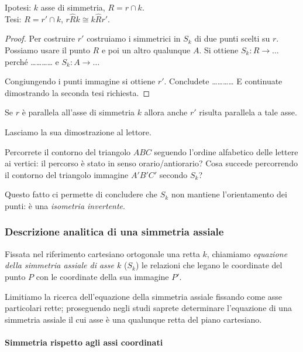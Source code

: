 \noindent Ipotesi: $k$ asse di simmetria, $R=r\cap k$.\\
Tesi: $R=r'\cap k$, $r\widehat{R}k\cong k\widehat{R}r'$.

\begin{proof}
Per costruire $r'$ costruiamo i simmetrici in $S_k$ di due punti scelti su $r$. Possiamo usare il punto $R$ e poi un altro qualunque $A$. Si ottiene $S_k: R \rightarrow \ldots{}$ perché \ldots\ldots\ldots\ldots{} e $S_k: A \rightarrow \ldots{}$

Congiungendo i punti immagine si ottiene $r'$. Concludete \ldots\ldots\ldots\ldots{}
E continuate dimostrando la seconda tesi richiesta.
\end{proof}

\begin{teorema}\label{teo:8.5}
Se $r$ è parallela all'asse di simmetria $k$ allora anche $r'$ risulta parallela a tale asse.
\end{teorema}

Lasciamo la sua dimostrazione al lettore.

Percorrete il contorno del triangolo $ABC$ seguendo l'ordine alfabetico delle lettere ai vertici: il percorso è stato in senso orario/antiorario? Cosa succede percorrendo il contorno del triangolo immagine $A'B'C'$ secondo $S_k$?

Questo fatto ci permette di concludere che $S_k$ non mantiene l'orientamento dei punti: è una \emph{isometria invertente}.

\subsubsection{Descrizione analitica di una simmetria assiale}

\begin{definizione}
Fissata nel riferimento cartesiano ortogonale una retta $k$, chiamiamo \emph{equazione della simmetria assiale di asse $k$} ($S_k$) le relazioni che legano le coordinate del punto $P$ con le coordinate della sua immagine $P'$.
\end{definizione}

Limitiamo la ricerca dell'equazione della simmetria assiale fissando come asse particolari rette; proseguendo negli studi saprete determinare l'equazione di una simmetria assiale il cui asse è una qualunque retta del piano cartesiano.

\paragraph{Simmetria rispetto agli assi coordinati}
~

